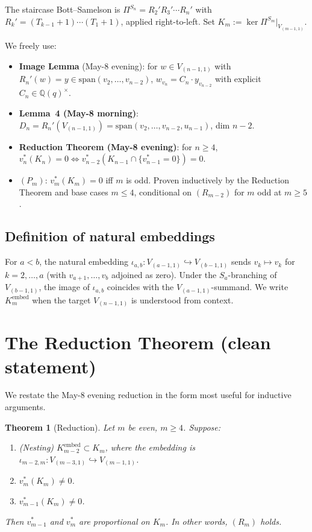 \documentclass[11pt]{article}
\newtheorem{theorem}{Theorem}
\theoremstyle{definition}
\begin{document}
The staircase Bott--Samelson is
$\Pi^{S_n} = R_2' R_3' \cdots R_n'$ with
$R_k' = (T_{k-1}+1)\cdots(T_1+1)$, applied right-to-left.
Set $K_m := \ker \Pi^{S_m}|_{V_{(m-1,1)}}$.

We freely use:
\begin{itemize}[topsep=0.3em,itemsep=0.2em,leftmargin=2em]
\item \textbf{Image Lemma} (May-8 evening): for $w \in V_{(n-1,1)}$
  with $R_n'(w) = y \in \mathrm{span}(v_2,\ldots, v_{n-2})$,
  $w_{v_n} = C_n \cdot y_{v_{n-2}}$ with explicit
  $C_n \in \mathbb{Q}(q)^\times$.
\item \textbf{Lemma~4 (May-8 morning)}: $D_n = R_n'(V_{(n-1,1)}) =
  \mathrm{span}(v_2,\ldots, v_{n-2}, u_{n-1})$, dim $n-2$.
\item \textbf{Reduction Theorem (May-8 evening)}: for $n \ge 4$,
  $v_n^*(K_n) = 0 \iff v_{n-2}^*(K_{n-1} \cap \{v_{n-1}^*=0\}) = 0$.
\item \textbf{$(P_m)$}: $v_m^*(K_m) = 0$ iff $m$ is odd. Proven
  inductively by the Reduction Theorem and base cases $m \le 4$,
  conditional on $(R_{m-2})$ for $m$ odd at $m \ge 5$.
\end{itemize}

\subsection{Definition of natural embeddings}
\label{ssec:embed}

For $a < b$, the natural embedding
$\iota_{a,b}\colon V_{(a-1,1)} \hookrightarrow V_{(b-1,1)}$ sends
$v_k \mapsto v_k$ for $k = 2, \ldots, a$ (with $v_{a+1}, \ldots, v_b$
adjoined as zero). Under the $S_a$-branching of $V_{(b-1,1)}$, the
image of $\iota_{a,b}$ coincides with the $V_{(a-1,1)}$-summand. We
write $K_m^{\mathrm{embed}}$ when the target $V_{(n-1,1)}$ is
understood from context.

\section{The Reduction Theorem (clean statement)}
\label{sec:reduction}

We restate the May-8 evening reduction in the form most useful for
inductive arguments.

\begin{theorem}[Reduction]\label{thm:reduction}
Let $m$ be even, $m \ge 4$. Suppose:
\begin{enumerate}[topsep=0.3em,itemsep=0.2em,leftmargin=2em]
\item[\rm(N)] (\emph{Nesting})
  $K_{m-2}^{\mathrm{embed}} \subset K_m$, where the embedding is
  $\iota_{m-2,m}\colon V_{(m-3,1)} \hookrightarrow V_{(m-1,1)}$.
\item[\rm($P_m$)] $v_m^*(K_m) \neq 0$.
\item[\rm($Q_m$)] $v_{m-1}^*(K_m) \neq 0$.
\end{enumerate}
Then $v_{m-1}^*$ and $v_m^*$ are proportional on $K_m$. In other
words, $(R_m)$ holds.
\end{theorem}
\end{document}
